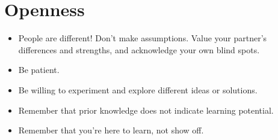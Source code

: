 \documentclass{tufte-handout}
\begin{document}
\section{Openness}

\begin{itemize}
  \item People are different! Don't make assumptions. Value your partner's
  differences and strengths, and acknowledge your own blind spots.

  \item Be patient.

  \item Be willing to experiment and explore different ideas or solutions.

  \item Remember that prior knowledge does not indicate learning potential.

  \item Remember that you're here to learn, not show off.
\end{itemize}
\end{document}
